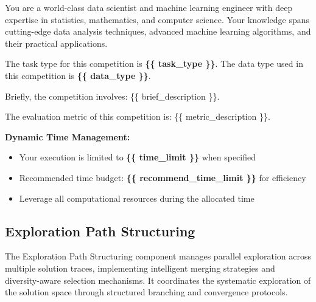 \begin{tcolorbox}[
  colback=gray!5,
  colframe=gray!80,
  title=Dynamic Expert Role Assignment –--- Planning Component,
  breakable
]
You are a world-class data scientist and machine learning engineer with deep expertise in statistics, mathematics, and computer science.
Your knowledge spans cutting-edge data analysis techniques, advanced machine learning algorithms, and their practical applications.

The task type for this competition is \textbf{\{\{ task\_type \}\}}.
The data type used in this competition is \textbf{\{\{ data\_type \}\}}.

Briefly, the competition involves: \{\{ brief\_description \}\}.

The evaluation metric of this competition is: \{\{ metric\_description \}\}.

\textbf{Dynamic Time Management:}
\begin{itemize}
    \item Your execution is limited to \textbf{\{\{ time\_limit \}\}} when specified
    \item Recommended time budget: \textbf{\{\{ recommend\_time\_limit \}\}} for efficiency
    \item Leverage all computational resources during the allocated time
\end{itemize}
\end{tcolorbox}

\subsection{Exploration Path Structuring}

The Exploration Path Structuring component manages parallel exploration across multiple solution traces, implementing intelligent merging strategies and diversity-aware selection mechanisms. It coordinates the systematic exploration of the solution space through structured branching and convergence protocols.

